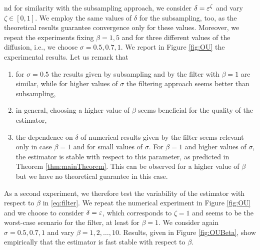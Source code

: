 \documentclass[10pt]{article}
\begin{document}
nd for similarity with the subsampling approach, we consider $\delta = \varepsilon^{\zeta}$ and vary $\zeta \in [0, 1]$. We employ the same values of $\delta$ for the subsampling, too, as the theoretical results guarantee convergence only for these values. Moreover, we repeat the experiments fixing $\beta = 1, 5$ and for three different values of the diffusion, i.e., we choose $\sigma = 0.5, 0.7, 1$. We report in Figure \ref{fig:OU} the experimental results. Let us remark that
\begin{enumerate}
	\item for $\sigma = 0.5$ the results given by subsampling and by the filter with $\beta = 1$ are similar, while for higher values of $\sigma$ the filtering approach seems better than subsampling, 
	\item in general, choosing a higher value of $\beta$ seems beneficial for the quality of the estimator,
	\item the dependence on $\delta$ of numerical results given by the filter seems relevant only in case $\beta = 1$ and for small values of $\sigma$. For $\beta = 1$ and higher values of $\sigma$, the estimator is stable with respect to this parameter, as predicted in Theorem \ref{thm:mainTheorem}. This can be observed for a higher value of $\beta$ but we have no theoretical guarantee in this case.
\end{enumerate}

As a second experiment, we therefore test the variability of the estimator with respect to $\beta$ in \eqref{eq:filter}. We repeat the numerical experiment in Figure \ref{fig:OU} and we choose to consider $\delta = \varepsilon$, which corresponds to $\zeta = 1$ and seems to be the worst-case scenario for the filter, at least for $\beta = 1$. We consider again $\sigma = 0.5, 0.7, 1$ and vary $\beta = 1, 2, \ldots, 10$. Results, given in Figure \ref{fig:OUBeta}, show empirically that the estimator is fast stable with respect to $\beta$.
\end{document}
